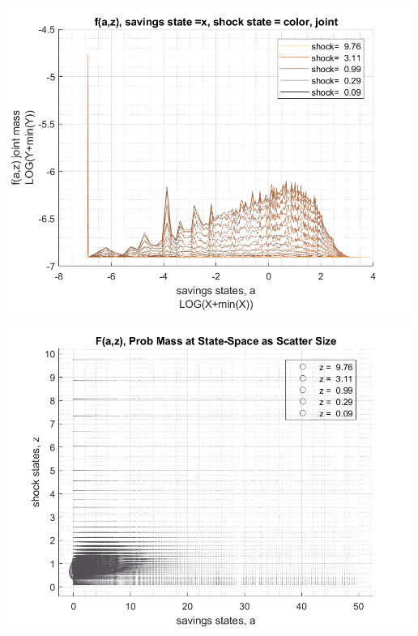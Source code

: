 \documentclass[
]{book}
\begin{document}
\includegraphics[width=5.20833in,height=\textheight]{img/fx_ds_az_loop_images/figure_15.png}

\includegraphics[width=5.20833in,height=\textheight]{img/fx_ds_az_loop_images/figure_16.png}
\end{document}
